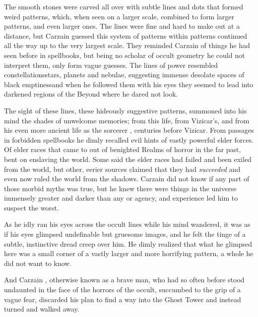 The smooth stones were carved all over with subtle lines and dots that formed weird patterns, which, when seen on a larger scale, combined to form larger patterns, and even larger ones.
The lines were fine and hard to make out at a distance, but Carzain guessed this system of patterns within patterns continued all the way up to the very largest scale. 
They reminded Carzain of things he had seen before in spellbooks, but being no scholar of occult geometry he could not interpret them, only form vague guesses. 
The lines of power resembled constellations\dash stars, planets and nebulae, suggesting immense desolate spaces of black emptiness\dash and when he followed them with his eyes they seemed to lead into darkened regions of the Beyond where he dared not look. 

The sight of these lines, these hideously suggestive patterns, summoned into his mind the shades of unwelcome memories; from this life, from Vizicar's, and from his even more ancient life as the sorcerer \TydesmosGendarInCaphet, centuries before Vizicar. 
From passages in forbidden spellbooks he dimly recalled evil hints of vastly powerful elder forces. 
Of elder races that came to \Miith out of benighted Realms of horror in the far past, bent on enslaving the world. 
Some said the elder races had failed and been exiled from the world, but other, eerier sources claimed that they had \emph{succeeded} and even now ruled the world from the shadows. 
Carzain did not know if any part of those morbid myths was true, but he knew there were things in the universe immensely greater and darker than any \human or \scathaese agency, and experience led him to suspect the worst. 

As he idly ran his eyes across the occult lines while his mind wandered, it was as if his eyes glimpsed undefinable but gruesome images, and he felt the tinge of a subtle, instinctive dread creep over him. 
He dimly realized that what he glimpsed here was a small corner of a vastly larger and more horrifying pattern, a whole he did not want to know. 

And Carzain \Shachar, otherwise known as a brave man, who had so often before stood undaunted in the face of the horrors of the occult, succumbed to the grip of a vague fear, discarded his plan to find a way into the Ghost Tower and instead turned and walked away. 










